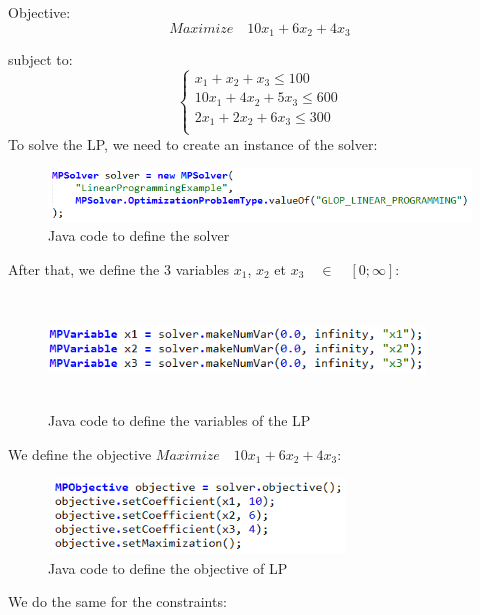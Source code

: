 \documentclass{report}
\begin{document}
Objective: 
\begin{equation}
Maximize \quad 10x_1 + 6x_2 + 4x_3
\end{equation}

subject to: \\
\begin{equation}
\begin{cases}
x_1 + x_2 + x_3 \leq 100\\
10x_1 + 4x_2 + 5x_3 \leq 600\\
2x_1 + 2x_2 + 6x_3 \leq 300\\
\end{cases}
\end{equation}
To solve the LP, we need to create an instance of the solver:
\begin{figure}[H]
\centering
\includegraphics[width=\textwidth]{lp-solver.png}
\caption{Java code to define the solver}
\end{figure}
After that, we define the 3 variables $x_1$, $x_2$ et $x_3 \quad \in \quad [0 ; \infty]$: \\
\begin{figure}[H]
\centering
\includegraphics[width=10cm,height=3cm,keepaspectratio]{lp-variables.png}
\caption{Java code to define the variables of the LP}
\end{figure}
We define the objective $Maximize \quad 10x_1 + 6x_2 + 4x_3$: \\
\begin{figure}[H]
\centering
\includegraphics[width=8cm,height=2cm,keepaspectratio]{lp-objectif.png}
\caption{Java code to define the objective of LP}
\end{figure}
We do the same for the constraints: \\
\end{document}
